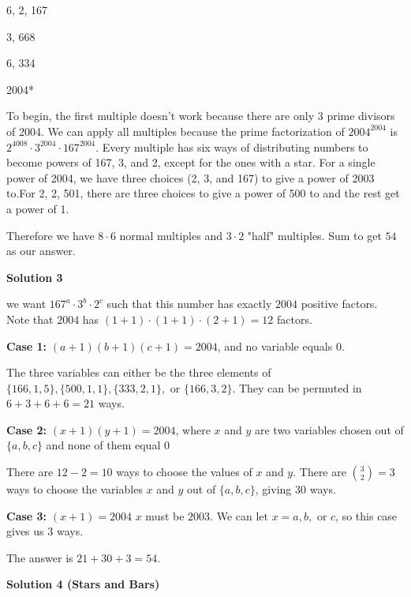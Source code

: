 \begin{enumerate}
 6, 2, 167

 3, 668

 6, 334

 2004*

 To begin, the first multiple doesn't work because there are only 3 prime divisors of 2004. We can apply all multiples because the prime factorization of $2004^{2004}$ is $2^{4008} \cdot 3^{2004} \cdot 167^{2004}.$ Every multiple has six ways of distributing numbers to become powers of 167, 3, and 2, except for the ones with a star. For a single power of 2004, we have three choices (2, 3, and 167) to give a power of 2003 to.For 2, 2, 501, there are three choices to give a power of 500 to and the rest get a power of 1.

 Therefore we have $8 \cdot 6$ normal multiples and $3 \cdot 2$ "half" multiples. Sum to get $\boxed{54}$ as our answer.

 


 



\textbf{Solution 3}

we want $167^a \cdot 3^b \cdot 2^c$ such that this number has exactly $2004$ positive factors. Note that $2004$ has $(1 + 1) \cdot (1 + 1) \cdot (2 + 1) = 12$ factors.

 


 \textbf{Case 1:} $(a + 1)(b + 1)(c + 1) = 2004$, and no variable equals $0.$

 


 The three variables can either be the three elements of $\{166, 1, 5\}, \{500, 1, 1\}, \{333, 2, 1\},$ or $\{166, 3, 2\}.$ They can be permuted in $6 + 3 + 6 + 6 = 21$ ways.

 


 \textbf{Case 2: } $(x + 1)(y + 1) = 2004$, where $x$ and $y$ are two variables chosen out of $\{a, b, c\}$ and none of them equal $0$

 


 There are $12 - 2 = 10$ ways to choose the values of $x$ and $y$. There are $\binom{3}{2} = 3$ ways to choose the variables $x$ and $y$ out of  $\{a, b, c\}$, giving $30$ ways.

 


 \textbf{Case 3:} $(x + 1) = 2004$
$x$ must be $2003$. We can let $x = a,b,$ or $c$, so this case gives us $3$ ways.

 
The answer is $21 + 30 + 3 = \boxed{54}.$




\textbf{Solution 4 (Stars and Bars)}



\end{enumerate}
